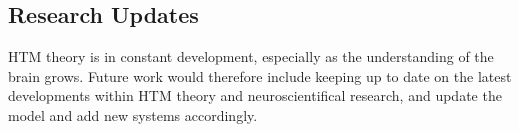 \subsection*{Research Updates}
HTM theory is in constant development, especially as the understanding of the brain grows. Future work would therefore include keeping up to date on the latest developments within HTM theory and neuroscientifical research, and update the model and add new systems accordingly.